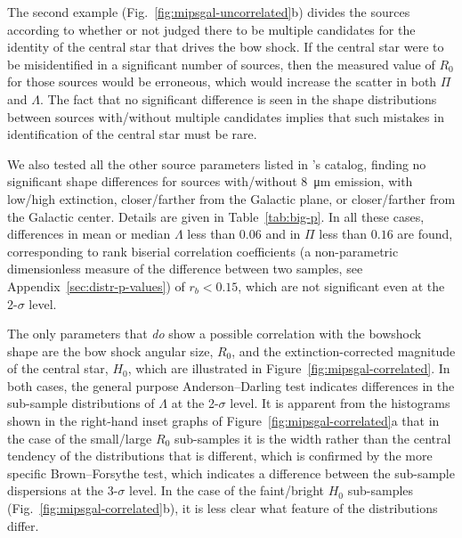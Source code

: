 The second example (Fig.~\ref{fig:mipsgal-uncorrelated}b) divides the
sources according to whether or not \citet{Kobulnicky:2016a} judged
there to be multiple candidates for the identity of the central star
that drives the bow shock.  If the central star were to be
misidentified in a significant number of sources, then the measured
value of \(R_0\) for those sources would be erroneous, which would
increase the scatter in both \(\Pi\) and \(\Lambda\).  The fact that no
significant difference is seen in the shape distributions between
sources with/without multiple candidates implies that such mistakes in
identification of the central star must be rare.

We also tested all the other source parameters listed in
\citeauthor{Kobulnicky:2016a}'s catalog, finding no significant shape
differences for sources with/without \SI{8}{\um} emission, with
low/high extinction, closer/farther from the Galactic plane, or
closer/farther from the Galactic center. Details are given in
Table~\ref{tab:big-p}.  In all these cases, differences in mean or
median \(\Lambda\) less than \(0.06\) and in \(\Pi\) less than
\(0.16\) are found, corresponding to rank biserial correlation
coefficients (a non-parametric dimensionless measure of the difference
between two samples, see Appendix~\ref{sec:distr-p-values}) of
\(r_b < 0.15\), which are not significant even at the 2-\(\sigma\) level.

The only parameters that \emph{do} show a possible correlation with
the bowshock shape are the bow shock angular size, \(R_0\), and the
extinction-corrected magnitude of the central star, \(H_0\), which are
illustrated in Figure~\ref{fig:mipsgal-correlated}.  In both cases,
the general purpose Anderson--Darling test indicates differences in the
sub-sample distributions of \(\Lambda\) at the 2-\(\sigma\) level.  It
is apparent from the histograms shown in the right-hand inset graphs
of Figure~\ref{fig:mipsgal-correlated}a that in the case of the
small/large \(R_0\) sub-samples it is the width rather than the
central tendency of the distributions that is different, which is
confirmed by the more specific Brown--Forsythe test, which indicates a
difference between the sub-sample dispersions at the 3-\(\sigma\) level.
In the case of the faint/bright \(H_0\) sub-samples
(Fig.~\ref{fig:mipsgal-correlated}b), it is less clear what
feature of the distributions differ.

